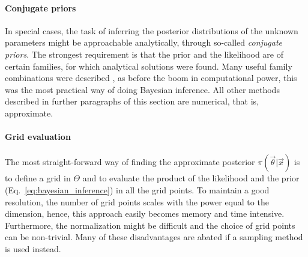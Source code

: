 \paragraph{Conjugate priors}
In special cases, the task of inferring the posterior distributions of the unknown parameters might be approachable analytically, through so-called \textit{conjugate priors}. The strongest requirement is that the prior and the likelihood are of certain families, for which analytical solutions were found. Many useful family combinations were described \citep{fink1997compendium}, as before the boom in computational power, this was the most practical way of doing Bayesian inference. All other methods described in further paragraphs of this section are numerical, that is, approximate.

\paragraph{Grid evaluation}
The most straight-forward way of finding the approximate posterior $\pi(\vec{\theta}|\vec{x})$ is to define a grid in $\Theta$ and to evaluate the product of the likelihood and the prior (Eq.~\ref{eq:bayesian_inference}) in all the grid points. To maintain a good resolution, the number of grid points scales with the power equal to the dimension, hence, this approach easily becomes memory and time intensive. Furthermore, the normalization might be difficult and the choice of grid points can be non-trivial. Many of these disadvantages are abated if a sampling method is used instead. 

